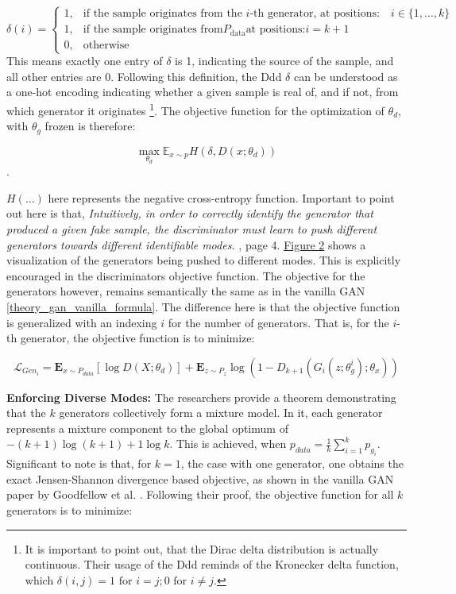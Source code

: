 \[
\delta(i) = 
\begin{cases}
1, & \text{if the sample originates from the } i\text{-th generator, at positions:} \quad i \in \{1, \ldots, k\} \\
1, & \text{if the sample originates from} P_{\text{data}} \text{at positions:} i = k+1 \\
0, & \text{otherwise}
\end{cases}
\]
This means exactly one entry of \(\delta\) is 1, indicating the source of the sample, and all other entries are 0.
 Following this definition, the Ddd \(\delta\) can be understood as a one-hot encoding indicating whether a given sample is real of, and if not, from which generator it originates \footnote{It is important to point out, that the Dirac delta distribution is actually continuous. Their usage of the Ddd reminds of the Kronecker delta function, which \( \delta(i,j) = 1 \text{ for } i=j; 0 \text{ for } i \ne j \).}. The objective function for the optimization of \(\theta_d\), with \(\theta_g\) frozen is therefore:

\begin{equation}
    \max\limits_{\theta_d}\mathbb{E}_{x \sim p} H(\delta, D(x; \theta_d))
\end{equation}.

\noindent
\(H(...)\) here represents the negative cross-entropy function. Important to point out here is that, \textit{Intuitively, in order to correctly identify the generator that produced a given fake sample, the discriminator must learn to push different generators towards different identifiable modes.} \cite{ghosh2018madgan}, page 4. \hyperref[fig:figure_madgan_diverse_mode_push]{Figure 2} shows a visualization of the generators being pushed to different modes. This is explicitly encouraged in the discriminators objective function. The objective for the generators however, remains semantically the same as in the vanilla GAN \ref{theory_gan_vanilla_formula}. The difference here is that the objective function is generalized with an indexing \(i\) for the number of generators. That is, for the \(i\)-th generator, the objective function is to minimize:

\begin{equation}
    \mathcal{L}_{Gen_i} = \mathbf{E}_{x \sim P_{data}} [ \log D(X; \theta_d) ] + \mathbf{E}_{z \sim P_{z}} \log (1-D_{k+1}(G_i(z; \theta_{g}^{i}); \theta_x))
\end{equation}

\noindent\textbf{Enforcing Diverse Modes:}
The researchers provide a theorem demonstrating that the \(k\) generators collectively form a mixture model. In it, each generator represents a mixture component to the global optimum of \( -(k+1)\log(k+1)+1 \log k \). This is achieved, when \(p_{data} = \frac{1}{k}\sum_{i=1}^{k} p_{g_i}\). Significant to note is that, for \(k = 1\), the case with one generator, one obtains the exact Jensen-Shannon divergence based objective, as shown in the vanilla GAN paper by Goodfellow et al. \cite{goodfellow2014generativeadversarialnetworks}. Following their proof, the objective function for all \(k\) generators is to minimize:

